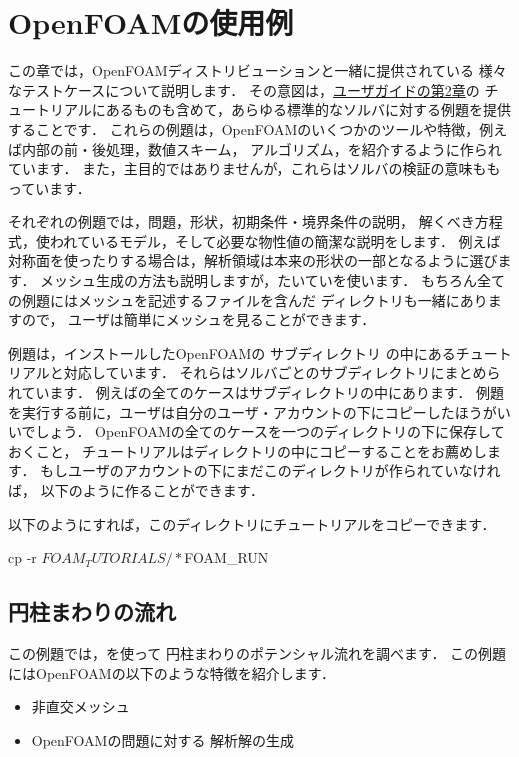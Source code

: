\chapter{OpenFOAMの使用例}
\label{chap:3}
この章では，OpenFOAMディストリビューションと一緒に提供されている
様々なテストケースについて説明します．
その意図は，\href{UserGuideJa.pdf#chapter.2}{ユーザガイドの第2章}の
チュートリアルにあるものも含めて，あらゆる標準的なソルバに対する例題を提供することです．
これらの例題は，OpenFOAMのいくつかのツールや特徴，例えば内部の前・後処理，数値スキーム，
アルゴリズム，を紹介するように作られています．
また，主目的ではありませんが，これらはソルバの検証の意味ももっています．

それぞれの例題では，問題，形状，初期条件・境界条件の説明，
解くべき方程式，使われているモデル，そして必要な物性値の簡潔な説明をします．
例えば対称面を使ったりする場合は，解析領域は本来の形状の一部となるように選びます．
メッシュ生成の方法も説明しますが，たいていを使います．
もちろん全ての例題にはメッシュを記述するファイルを含んだ
ディレクトリも一緒にありますので，
ユーザは簡単にメッシュを見ることができます．

例題は，インストールしたOpenFOAMの
%
サブディレクトリ
の中にあるチュートリアルと対応しています．
それらはソルバごとのサブディレクトリにまとめられています．
例えばの全てのケースはサブディレクトリの中にあります．
例題を実行する前に，ユーザは自分のユーザ・アカウントの下にコピーしたほうがいいでしょう．
OpenFOAMの全てのケースを一つのディレクトリの下に保存しておくこと，
チュートリアルはディレクトリの中にコピーすることをお薦めします．
もしユーザのアカウントの下にまだこのディレクトリが作られていなければ，
以下のように作ることができます．
以下のようにすれば，このディレクトリにチュートリアルをコピーできます．
\begin{OFverbatim}[terminal]
cp -r $FOAM_TUTORIALS/* $FOAM_RUN
\end{OFverbatim}



\section{円柱まわりの流れ}
\label{sec:3.1}
この例題では，を使って
%
%
%
円柱まわりのポテンシャル流れを調べます．
この例題にはOpenFOAMの以下のような特徴を紹介します．
\begin{itemize}
%
%
 \item 非直交メッシュ
 \item OpenFOAMの問題に対する
%
解析解の生成
\end{itemize}


